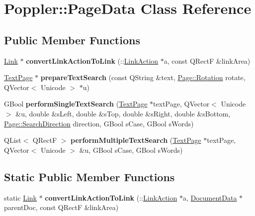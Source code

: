 \hypertarget{class_poppler_1_1_page_data}{}\section{Poppler\+:\+:Page\+Data Class Reference}
\label{class_poppler_1_1_page_data}
\subsection*{Public Member Functions}
\begin{DoxyCompactItemize}
\item 
\mbox{\label{class_poppler_1_1_page_data_ac0a49f7ab8485a8e30a89a4fe350c2c0}} 
\hyperlink{class_poppler_1_1_link}{Link} $\ast$ {\bfseries convert\+Link\+Action\+To\+Link} (\+::\hyperlink{class_poppler_1_1_link_action}{Link\+Action} $\ast$a, const Q\+RectF \&link\+Area)
\item 
\mbox{\label{class_poppler_1_1_page_data_a42ca92fcd18fbee584eba03d0d05f3b4}} 
\hyperlink{class_text_page}{Text\+Page} $\ast$ {\bfseries prepare\+Text\+Search} (const Q\+String \&text, \hyperlink{class_poppler_1_1_page_a9c9a4e1bc301cd2ab4eac0b51f0dc0ec}{Page\+::\+Rotation} rotate, Q\+Vector$<$ Unicode $>$ $\ast$u)
\item 
\mbox{\label{class_poppler_1_1_page_data_af89498020b927b216258aefadb09339a}} 
G\+Bool {\bfseries perform\+Single\+Text\+Search} (\hyperlink{class_text_page}{Text\+Page} $\ast$text\+Page, Q\+Vector$<$ Unicode $>$ \&u, double \&s\+Left, double \&s\+Top, double \&s\+Right, double \&s\+Bottom, \hyperlink{class_poppler_1_1_page_a693343ece22aa954a6357e97625e7c93}{Page\+::\+Search\+Direction} direction, G\+Bool s\+Case, G\+Bool s\+Words)
\item 
\mbox{\label{class_poppler_1_1_page_data_abb2b664a74e2fb158d815475a66446ee}} 
Q\+List$<$ Q\+RectF $>$ {\bfseries perform\+Multiple\+Text\+Search} (\hyperlink{class_text_page}{Text\+Page} $\ast$text\+Page, Q\+Vector$<$ Unicode $>$ \&u, G\+Bool s\+Case, G\+Bool s\+Words)
\end{DoxyCompactItemize}
\subsection*{Static Public Member Functions}
\begin{DoxyCompactItemize}
\item 
\mbox{\label{class_poppler_1_1_page_data_ab7722cadf4ca154a74747cdf59df88ce}} 
static \hyperlink{class_poppler_1_1_link}{Link} $\ast$ {\bfseries convert\+Link\+Action\+To\+Link} (\+::\hyperlink{class_poppler_1_1_link_action}{Link\+Action} $\ast$a, \hyperlink{class_poppler_1_1_document_data}{Document\+Data} $\ast$parent\+Doc, const Q\+RectF \&link\+Area)
\end{DoxyCompactItemize}
